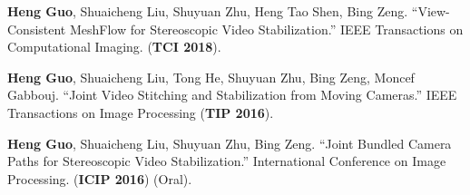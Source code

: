 \begin{enumerate}[label={[\arabic*]}]
	\item \textbf{Heng Guo}, Shuaicheng Liu, Shuyuan Zhu, Heng Tao Shen, Bing Zeng. ``View-Consistent MeshFlow for Stereoscopic Video Stabilization.'' IEEE Transactions on Computational Imaging. (\textbf{TCI 2018}).
	\item \textbf{Heng Guo}, Shuaicheng Liu, Tong He, Shuyuan Zhu, Bing Zeng, Moncef Gabbouj. ``Joint Video Stitching and Stabilization from Moving Cameras.'' IEEE Transactions on Image Processing (\textbf{TIP 2016}).
	\item \textbf{Heng Guo}, Shuaicheng Liu, Shuyuan Zhu, Bing Zeng. ``Joint Bundled Camera Paths for Stereoscopic Video Stabilization.'' International Conference on Image Processing. (\textbf{ICIP 2016}) (Oral).
\end{enumerate}
